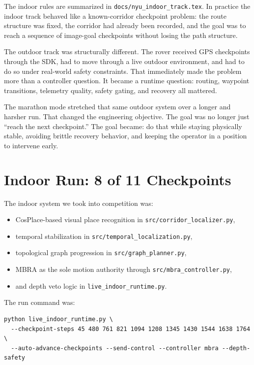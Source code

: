 \documentclass[11pt]{article}
\begin{document}
The indoor rules are summarized in \texttt{docs/nyu\_indoor\_track.tex}. In practice
the indoor track behaved like a known-corridor checkpoint problem: the route
structure was fixed, the corridor had already been recorded, and the goal was to
reach a sequence of image-goal checkpoints without losing the path structure.

The outdoor track was structurally different. The rover received GPS checkpoints
through the SDK, had to move through a live outdoor environment, and had to do so
under real-world safety constraints. That immediately made the problem more than a
controller question. It became a runtime question: routing, waypoint transitions,
telemetry quality, safety gating, and recovery all mattered.

The marathon mode stretched that same outdoor system over a longer and harsher run.
That changed the engineering objective. The goal was no longer just ``reach the
next checkpoint.'' The goal became: do that while staying physically stable,
avoiding brittle recovery behavior, and keeping the operator in a position to
intervene early.

\section{Indoor Run: 8 of 11 Checkpoints}

The indoor system we took into competition was:

\begin{itemize}[nosep]
  \item CosPlace-based visual place recognition in \texttt{src/corridor\_localizer.py},
  \item temporal stabilization in \texttt{src/temporal\_localization.py},
  \item topological graph progression in \texttt{src/graph\_planner.py},
  \item MBRA as the sole motion authority through \texttt{src/mbra\_controller.py},
  \item and depth veto logic in \texttt{live\_indoor\_runtime.py}.
\end{itemize}

The run command was:

\begin{verbatim}
python live_indoor_runtime.py \
  --checkpoint-steps 45 480 761 821 1094 1208 1345 1430 1544 1638 1764 \
  --auto-advance-checkpoints --send-control --controller mbra --depth-safety
\end{verbatim}
\end{document}
